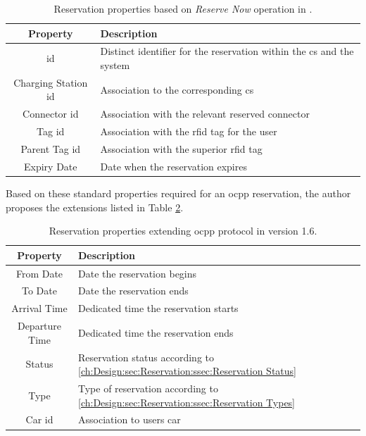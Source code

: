 \begingroup
\setlength{\tabcolsep}{10pt} %
\renewcommand{\arraystretch}{1.5} %
\begin{table}[h]
    \centering
    \caption{Reservation properties based on \textit{Reserve Now} operation in \cite{noauthor_ocpp_nodate}.}
    \begin{tabular}{c|m{10cm}}
        Property & Description \\ \hline
        \acrshort{id} & Distinct identifier for the reservation within the \acrshort{cs} and the system \\
        Charging Station \acrshort{id} & Association to the corresponding \acrshort{cs} \\
        Connector \acrshort{id} & Association with the relevant reserved connector \\
        Tag \acrshort{id} & Association with the \acrshort{rfid} tag for the user \\
        Parent Tag \acrshort{id} & Association with the superior \acrshort{rfid} tag \\
        Expiry Date & Date when the reservation expires
    \end{tabular}
    \label{tab:reservation-ocpp-properties}
\end{table}
\endgroup

\newpage

\noindent Based on these standard properties required for an \acrshort{ocpp} reservation, the author proposes the extensions listed in Table \ref{tab:reservation-extended-properties}.

\begingroup
\setlength{\tabcolsep}{10pt} %
\renewcommand{\arraystretch}{1.5} %
\begin{table}[h]
    \centering
    \caption{Reservation properties extending \acrshort{ocpp} protocol in version 1.6.}
    \begin{tabular}{c|m{10cm}}
        Property & Description \\ \hline
        From Date & Date the reservation begins \\ 
        To Date & Date the reservation ends \\
        Arrival Time & Dedicated time the reservation starts \\
        Departure Time & Dedicated time the reservation ends \\
        Status & Reservation status according to \ref{ch:Design:sec:Reservation:ssec:Reservation Status} \\
        Type & Type of reservation according to \ref{ch:Design:sec:Reservation:ssec:Reservation Types} \\
        Car \acrshort{id} & Association to users car 
    \end{tabular}
    \label{tab:reservation-extended-properties}
\end{table}
\endgroup

